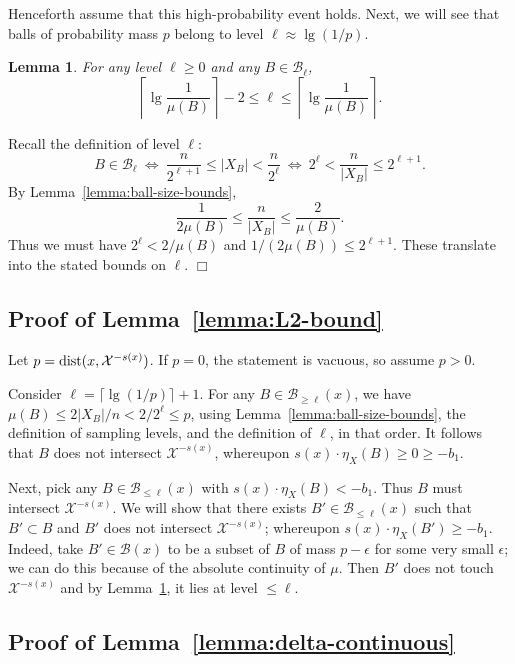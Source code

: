 \documentclass{article}
\def\X{{\mathcal X}}
\def\B{{\mathcal B}}
\def\dist{{\rm dist}}
\newtheorem{lemma}[thm]{Lemma}
\newenvironment{proof}{\noindent {\sc Proof:}}{$\Box$ \medskip}
\begin{document}
Henceforth assume that this high-probability event holds. Next, we will see that balls of probability mass $p$ belong to level $\ell \approx \lg (1/p)$.
\begin{lemma}
For any level $\ell \geq 0$ and any $B \in \B_{\ell}$,
$$ \left\lceil \lg \frac{1}{\mu(B)} \right\rceil -2 \leq \ell \leq  \left\lceil \lg \frac{1}{\mu(B)} \right\rceil.$$
\label{lemma:mass-vs-level}
\end{lemma}
\begin{proof}
Recall the definition of level $\ell$:
$$ B \in \B_\ell 
\ \Longleftrightarrow \ \frac{n}{2^{\ell+1}} \leq |X_B| < \frac{n}{2^\ell} 
\ \Longleftrightarrow \ 2^\ell < \frac{n}{|X_B|} \leq 2^{\ell + 1}.$$
By Lemma~\ref{lemma:ball-size-bounds}, 
$$ \frac{1}{2 \mu(B)} \leq \frac{n}{|X_B|} \leq \frac{2}{\mu(B)}.$$
Thus we must have $2^{\ell} < 2/\mu(B)$ and $1/(2 \mu(B)) \leq 2^{\ell+1}$. These translate into the stated bounds on $\ell$.
\end{proof}

\subsection{Proof of Lemma~\ref{lemma:L2-bound}}

Let $p = \dist(x, \X^{-s(x)})$. If $p = 0$, the statement is vacuous, so assume $p > 0$.

Consider $\ell = \lceil \lg (1/p) \rceil + 1$. For any $B \in \B_{\geq \ell}(x)$, we have $\mu(B) \leq 2|X_B|/n < 2/2^\ell \leq p$, using Lemma~\ref{lemma:ball-size-bounds}, the definition of sampling levels, and the definition of $\ell$, in that order. It follows that $B$ does not intersect $\X^{-s(x)}$, whereupon $s(x) \cdot \eta_X(B) \geq 0 \geq -b_1$.

Next, pick any $B \in \B_{\leq \ell}(x)$ with $s(x) \cdot \eta_X(B) < -b_1$. Thus $B$ must intersect $\X^{-s(x)}$. We will show that there exists $B' \in \B_{\leq \ell}(x)$ such that $B' \subset B$ and $B'$ does not intersect $\X^{-s(x)}$; whereupon $s(x) \cdot \eta_X(B') \geq -b_1$. Indeed, take $B' \in \B(x)$ to be a subset of $B$ of mass $p-\epsilon$ for some very small $\epsilon$; we can do this because of the absolute continuity of $\mu$. Then $B'$ does not touch $\X^{-s(x)}$ and by Lemma~\ref{lemma:mass-vs-level}, it lies at level $\leq \ell$.

\subsection{Proof of Lemma~\ref{lemma:delta-continuous}}
\end{document}

